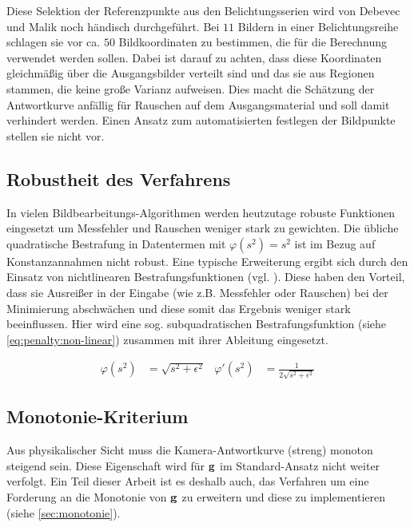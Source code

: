 Diese Selektion der Referenzpunkte aus den Belichtungsserien wird von Debevec und Malik noch händisch durchgeführt. Bei $11$ Bildern in einer Belichtungsreihe schlagen sie vor ca. $50$ Bildkoordinaten zu bestimmen, die für die Berechnung verwendet werden sollen. Dabei ist darauf zu achten, dass diese Koordinaten gleichmäßig über die Ausgangsbilder verteilt sind und das sie aus Regionen stammen, die keine große Varianz aufweisen. Dies macht die Schätzung der Antwortkurve anfällig für Rauschen auf dem Ausgangsmaterial und soll damit verhindert werden. Einen Ansatz zum automatisierten festlegen der Bildpunkte stellen sie nicht vor.

\subsection{Robustheit des Verfahrens}
\label{algo:schwachstellen:robustheit}
In vielen Bildbearbeitungs-Algorithmen werden heutzutage robuste Funktionen eingesetzt um Messfehler und Rauschen weniger stark zu gewichten. Die übliche quadratische Bestrafung in Datentermen mit $\varphi(s^2) = s^2$ ist im Bezug auf Konstanzannahmen nicht robust. Eine typische Erweiterung ergibt sich durch den Einsatz von nichtlinearen Bestrafungsfunktionen (vgl. \cite[S. 9f, S. 87f]{bruhn06}). Diese haben den Vorteil, dass sie Ausreißer in der Eingabe (wie z.B. Messfehler oder Rauschen) bei der Minimierung abschwächen und diese somit das Ergebnis weniger stark beeinflussen. Hier wird eine sog. subquadratischen Bestrafungsfunktion (siehe \autoref{eq:penalty:non-linear}) zusammen mit ihrer Ableitung eingesetzt.

\begin{align}
\label{eq:penalty:non-linear}
\varphi(s^2) &= \sqrt{s^2 + \epsilon^2} & 
\varphi'(s^2) &= \frac{1}{2\sqrt{s^2 + \epsilon^2}}
\end{align}

\subsection{Monotonie-Kriterium}
\label{algo:schwachstellen:monotonie}
Aus physikalischer Sicht muss die Kamera-Antwortkurve (streng) monoton steigend sein. Diese Eigenschaft wird für $\mathbf g$ im Standard-Ansatz nicht weiter verfolgt. Ein Teil dieser Arbeit ist es deshalb auch, das Verfahren um eine Forderung an die Monotonie von $\mathbf g$ zu erweitern und diese zu implementieren (siehe \autoref{sec:monotonie}).
